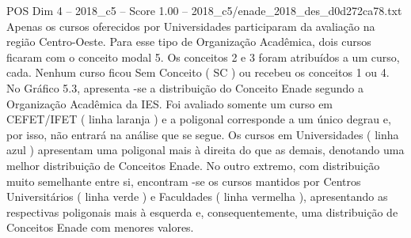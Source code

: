 \begin{textsample}{POS Dim 4 – 2018\_c5 – Score 1.00 – 2018\_c5/enade\_2018\_des\_d0d272ca78.txt}
Apenas os cursos oferecidos por Universidades participaram da avaliação na região Centro-Oeste.
Para esse tipo de Organização Acadêmica, dois cursos ficaram com o conceito modal 5.
Os conceitos 2 e 3 foram atribuídos a um curso, cada.
Nenhum curso ficou Sem Conceito ( SC ) ou recebeu os conceitos 1 ou 4.
No Gráfico 5.3, apresenta -se a distribuição do Conceito Enade segundo a Organização Acadêmica da IES.
Foi avaliado somente um curso em CEFET/IFET ( linha laranja ) e a poligonal corresponde a um único degrau e, por isso, não entrará na análise que se segue.
Os cursos em Universidades ( linha azul ) apresentam uma poligonal mais à direita do que as demais, denotando uma melhor distribuição de Conceitos Enade.
No outro extremo, com distribuição muito semelhante entre si, encontram -se os cursos mantidos por Centros Universitários ( linha verde ) e Faculdades ( linha vermelha ), apresentando as respectivas poligonais mais à esquerda e, consequentemente, uma distribuição de Conceitos Enade com menores valores.

\end{textsample}
